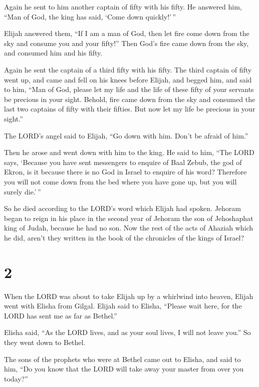  Again he sent to him another captain of fifty with his
fifty. He answered him, ``Man of God, the king has said, `Come down
quickly!'\,''

 Elijah answered them, ``If I am a man of God, then let
fire come down from the sky and consume you and your fifty!'' Then God's
fire came down from the sky, and consumed him and his fifty.

 Again he sent the captain of a third fifty with his fifty.
The third captain of fifty went up, and came and fell on his knees
before Elijah, and begged him, and said to him, ``Man of God, please let
my life and the life of these fifty of your servants be precious in your
sight.  Behold, fire came down from the sky and consumed
the last two captains of fifty with their fifties. But now let my life
be precious in your sight.''

 The LORD's angel said to Elijah, ``Go down with him. Don't
be afraid of him.''

Then he arose and went down with him to the king.  He said
to him, ``The LORD says, `Because you have sent messengers to enquire of
Baal Zebub, the god of Ekron, is it because there is no God in Israel to
enquire of his word? Therefore you will not come down from the bed where
you have gone up, but you will surely die.'\,''

 So he died according to the LORD's word which Elijah had
spoken. Jehoram began to reign in his place in the second year of
Jehoram the son of Jehoshaphat king of Judah, because he had no son.
 Now the rest of the acts of Ahaziah which he did, aren't
they written in the book of the chronicles of the kings of Israel?

\hypertarget{section-1}{%
\section{2}\label{section-1}}

 When the LORD was about to take Elijah up by a whirlwind
into heaven, Elijah went with Elisha from Gilgal.  Elijah
said to Elisha, ``Please wait here, for the LORD has sent me as far as
Bethel.''

Elisha said, ``As the LORD lives, and as your soul lives, I will not
leave you.'' So they went down to Bethel.

 The sons of the prophets who were at Bethel came out to
Elisha, and said to him, ``Do you know that the LORD will take away your
master from over you today?''


